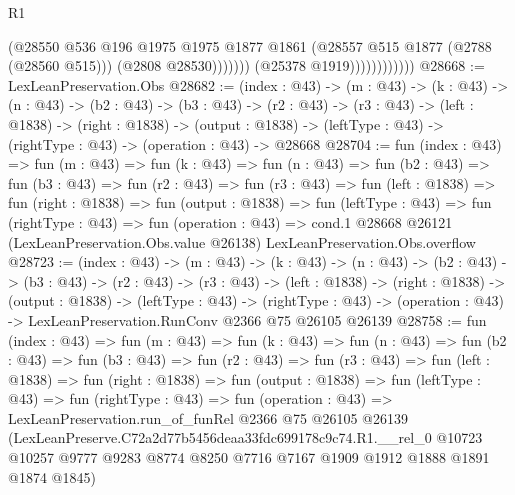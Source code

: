 \begin{lexlean}{R1}
\begin{coremodule}
                                    (@28550
                                      @536
                                      @196
                                      @1975
                                      @1975
                                      @1877
                                      @1861
                                      (@28557 @515 @1877 (@2788 (@28560 @515)))
                                      (@2808 @28530)))))))
                          (@25378 @1919))))))))))))
@28668 := LexLeanPreservation.Obs
@28682 := (index : @43) ->
  (m : @43) ->
  (k : @43) ->
  (n : @43) ->
  (b2 : @43) ->
  (b3 : @43) ->
  (r2 : @43) ->
  (r3 : @43) ->
  (left : @1838) ->
  (right : @1838) ->
  (output : @1838) -> (leftType : @43) -> (rightType : @43) -> (operation : @43) -> @28668
@28704 := fun (index : @43) =>
  fun (m : @43) =>
  fun (k : @43) =>
  fun (n : @43) =>
  fun (b2 : @43) =>
  fun (b3 : @43) =>
  fun (r2 : @43) =>
  fun (r3 : @43) =>
  fun (left : @1838) =>
  fun (right : @1838) =>
  fun (output : @1838) =>
  fun (leftType : @43) =>
  fun (rightType : @43) =>
  fun (operation : @43) =>
  cond.{1} @28668 @26121 (LexLeanPreservation.Obs.value @26138) LexLeanPreservation.Obs.overflow
@28723 := (index : @43) ->
  (m : @43) ->
  (k : @43) ->
  (n : @43) ->
  (b2 : @43) ->
  (b3 : @43) ->
  (r2 : @43) ->
  (r3 : @43) ->
  (left : @1838) ->
  (right : @1838) ->
  (output : @1838) ->
  (leftType : @43) ->
  (rightType : @43) -> (operation : @43) -> LexLeanPreservation.RunConv @2366 @75 @26105 @26139
@28758 := fun (index : @43) =>
  fun (m : @43) =>
  fun (k : @43) =>
  fun (n : @43) =>
  fun (b2 : @43) =>
  fun (b3 : @43) =>
  fun (r2 : @43) =>
  fun (r3 : @43) =>
  fun (left : @1838) =>
  fun (right : @1838) =>
  fun (output : @1838) =>
  fun (leftType : @43) =>
  fun (rightType : @43) =>
  fun (operation : @43) =>
  LexLeanPreservation.run_of_funRel
    @2366
    @75
    @26105
    @26139
    (LexLeanPreserve.C72a2d77b5456deaa33fdc699178c9c74.R1.__rel_0
      @10723
      @10257
      @9777
      @9283
      @8774
      @8250
      @7716
      @7167
      @1909
      @1912
      @1888
      @1891
      @1874
      @1845)
\end{coremodule}
\end{lexlean}
